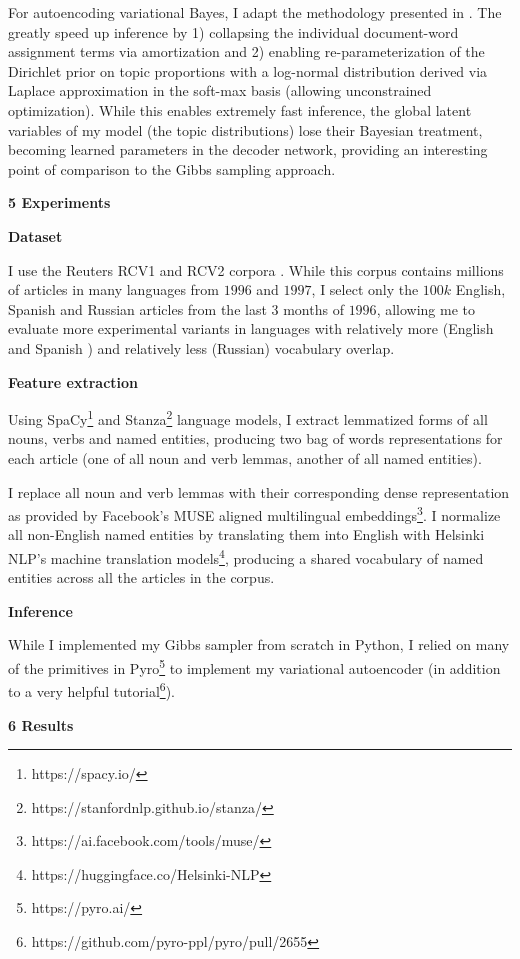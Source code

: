 \documentclass[12pt]{article}
\begin{document}
For autoencoding variational Bayes, I adapt the methodology presented in \cite{kingma2013auto}.  The greatly speed up inference by 1) collapsing the individual document-word assignment terms via amortization and 2) enabling re-parameterization of the Dirichlet prior on topic proportions with a log-normal distribution derived via Laplace approximation in the soft-max basis (allowing  unconstrained optimization).  While this enables extremely fast inference, the global latent variables of my model (the topic distributions) lose their Bayesian treatment, becoming learned parameters in the decoder network, providing an interesting point of comparison to the Gibbs sampling approach.

\textbf{5 Experiments}

\textbf{Dataset}

I use the Reuters RCV1 and RCV2 corpora \cite{lewis2004rcv1}.  While this corpus contains millions of articles in many languages from $1996$ and $1997$, I select only the $100k$ English, Spanish and Russian articles from the last 3 months of $1996$, allowing me to evaluate more experimental variants in languages with relatively more (English and Spanish ) and relatively less (Russian) vocabulary overlap.

\textbf{Feature extraction}

Using SpaCy\footnote{https://spacy.io/} and Stanza\footnote{https://stanfordnlp.github.io/stanza/} language models, I extract lemmatized forms of all nouns, verbs and named entities, producing two bag of words representations for each article (one of all noun and verb lemmas, another of all named entities).

I replace all noun and verb lemmas with their corresponding dense representation as provided by Facebook's MUSE aligned multilingual embeddings\footnote{https://ai.facebook.com/tools/muse/}.  I normalize all non-English named entities by translating them into English with Helsinki NLP's machine translation models\footnote{https://huggingface.co/Helsinki-NLP}, producing a shared vocabulary of named entities across all the articles in the corpus.

\textbf{Inference}

While I implemented my Gibbs sampler from scratch in Python, I relied on many of the primitives in Pyro\footnote{https://pyro.ai/} to implement my variational autoencoder (in addition to a very helpful tutorial\footnote{https://github.com/pyro-ppl/pyro/pull/2655}).

\textbf{6 Results}
\end{document}
